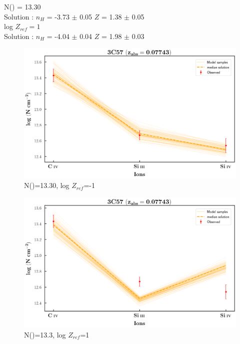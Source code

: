\documentclass[12pt]{report}
\newcommand\ion[2]{\text{#1\,\textsc{\lowercase{#2}}}}
\begin{document}
N(\ion{H}{I}) = 13.30   \\ 

Solution : $n_H$ = -3.73 $\pm$ 0.05 \hspace{10mm} $Z$ = 1.38 $\pm$ 0.05 \\

log $Z_{ref}=1$ \\

Solution : $n_H$ = -4.04 $\pm$ 0.04 \hspace{10mm} $Z$ = 1.98 $\pm$ 0.03 \newline  

\newpage

\begin{figure}[!t]
    \centering
    \includegraphics[width=0.9\linewidth]{Ionisation-Modelling-Plots/3c57-z=0.07743-compI_logZ=-1.png}
    \caption{N(\ion{H}{i})=13.30, log $Z_{ref}$=-1}
\end{figure}

\begin{figure}[!b]
    \centering
    \includegraphics[width=0.9\linewidth]{Ionisation-Modelling-Plots/3c57-z=0.07743-compI_logZ=1.png}
    \caption{N(\ion{H}{i})=13.3, log $Z_{ref}$=1}
\end{figure}
\end{document}
